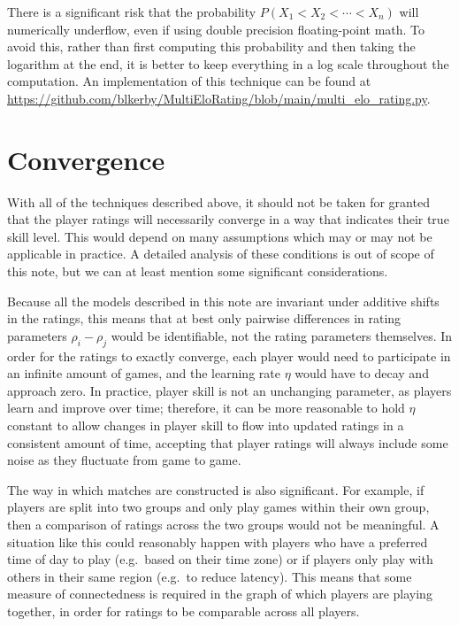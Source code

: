 \documentclass{article}
\begin{document}
	There is a significant risk that the probability $P(X_1 < X_2 < \cdots < X_n)$ will numerically underflow, even if using double precision floating-point math.
	To avoid this, rather than first computing this probability and then taking the logarithm at the end, it is better to keep everything in a log scale throughout the computation. An implementation of this technique can be found at \url{https://github.com/blkerby/MultiEloRating/blob/main/multi_elo_rating.py}.
	
	\section{Convergence}
	With all of the techniques described above, it should not be taken for granted that the player ratings will necessarily converge in a way that indicates their true skill level. This would depend on many assumptions which may or may not be applicable in practice. A detailed analysis of these conditions is out of scope of this note, but we can at least mention some significant considerations.
	
	Because all the models described in this note are invariant under additive shifts in the ratings, this means that at best only pairwise differences in rating parameters $\rho_i - \rho_j$ would be identifiable, not the rating parameters themselves. In order for the ratings to exactly converge, each player would need to participate in an infinite amount of games, and the learning rate $\eta$ would have to decay and approach zero. In practice, player skill is not an unchanging parameter, as players learn and improve over time; therefore, it can be more reasonable to hold $\eta$ constant to allow changes in player skill to flow into updated ratings in a consistent amount of time, accepting that player ratings will always include some noise as they fluctuate from game to game.
	
	The way in which matches are constructed is also significant. For example, if players are split into two groups and only play games within their own group, then a comparison of ratings across the two groups would not be meaningful. A situation like this could reasonably happen with players who have a preferred time of day to play (e.g.\ based on their time zone) or if players only play with others in their same region (e.g.\ to reduce latency). This means that some measure of connectedness is required in the graph of which players are playing together, in order for ratings to be comparable across all players.
	
\end{document}
